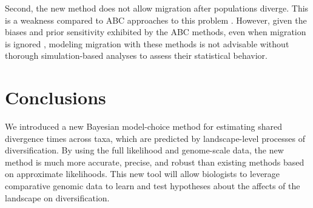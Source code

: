 Second, the new method does not allow migration after populations diverge.
This is a weakness compared to ABC approaches to this problem
\citep{Huang2011,Oaks2014dpp}.
However, given the biases and prior sensitivity exhibited
by the ABC methods, even when migration is ignored
\citep{Oaks2012,Oaks2014reply,Oaks2014dpp},
modeling migration with these methods is not advisable without thorough
simulation-based analyses to assess their statistical behavior.

\section{Conclusions}
We introduced a new Bayesian model-choice method for estimating shared
divergence times across taxa, which are predicted by landscape-level processes
of diversification.
By using the full likelihood and genome-scale data, the new method is much more
accurate, precise, and robust than existing methods based on approximate
likelihoods.
This new tool will allow biologists to leverage comparative genomic data to
learn and test hypotheses about the affects of the landscape on
diversification.

